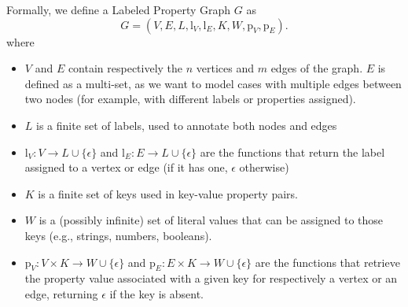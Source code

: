 \begin{definition}\label{def:lpg}
    Formally, we define a Labeled Property Graph $G$ as
    \[
        G = (V, E, L, \mathrm{l}_V, \mathrm{l}_E, K, W, \mathrm{p}_V, \mathrm{p}_E).
    \]
    where
    \begin{itemize}
        \item $V$ and $E$ contain respectively the $n$ vertices and $m$ edges of the graph. $E$ is defined as a multi-set, as we want to model cases with multiple edges between two nodes (for example, with different labels or properties assigned).
        \item $L$ is a finite set of labels, used to annotate both nodes and edges
        \item $\mathrm{l}_V: V \to L \cup \{\epsilon\}$ and $\mathrm{l}_E: E \to L \cup \{\epsilon\}$ are the functions that return the label assigned to a vertex or edge (if it has one, $\epsilon$ otherwise)
        \item $K$ is a finite set of keys used in key-value property pairs.
        \item $W$ is a (possibly infinite) set of literal values that can be assigned to those keys (e.g., strings, numbers, booleans).
        \item $\mathrm{p}_V: V \times K \to W \cup \{ \epsilon \}$ and $\mathrm{p}_E: E \times K \to W \cup \{\epsilon\}$ are the functions that retrieve the property value associated with a given key for respectively a vertex or an edge, returning $\epsilon$ if the key is absent.
    \end{itemize}
\end{definition}



